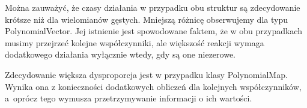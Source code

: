 Można zauważyć, że czasy działania w przypadku obu struktur są zdecydowanie krótsze niż dla wielomianów gęstych. Mniejszą różnicę obserwujemy dla typu PolynomialVector. Jej istnienie jest spowodowane faktem, że w obu przypadkach musimy przejrzeć kolejne współczynniki, ale większość reakcji wymaga dodatkowego działania wyłącznie wtedy, gdy są one niezerowe.

Zdecydowanie większa dysproporcja jest w przypadku klasy PolynomialMap. Wynika ona z konieczności dodatkowych obliczeń dla kolejnych współczynników, a~oprócz tego wymusza przetrzymywanie informacji o ich wartości.
